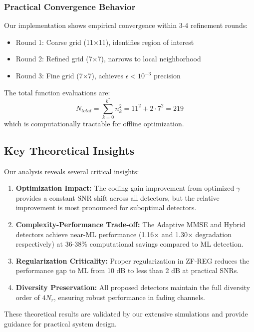 \subsubsection{Practical Convergence Behavior}
Our implementation shows empirical convergence within 3-4 refinement rounds:
\begin{itemize}
    \item Round 1: Coarse grid (11×11), identifies region of interest
    \item Round 2: Refined grid (7×7), narrows to local neighborhood  
    \item Round 3: Fine grid (7×7), achieves $\epsilon < 10^{-3}$ precision
\end{itemize}

The total function evaluations are:
\begin{equation}
N_{total} = \sum_{k=0}^{k^*} n_k^2 = 11^2 + 2 \cdot 7^2 = 219
\end{equation}
which is computationally tractable for offline optimization.

\subsection{Key Theoretical Insights}

Our analysis reveals several critical insights:
\begin{enumerate}
    \item \textbf{Optimization Impact:} The coding gain improvement from optimized $\gamma$ provides a constant SNR shift across all detectors, but the relative improvement is most pronounced for suboptimal detectors.
    
    \item \textbf{Complexity-Performance Trade-off:} The Adaptive MMSE and Hybrid detectors achieve near-ML performance (1.16× and 1.30× degradation respectively) at 36-38\% computational savings compared to ML detection.
    
    \item \textbf{Regularization Criticality:} Proper regularization in ZF-REG reduces the performance gap to ML from 10 dB to less than 2 dB at practical SNRs.
    
    \item \textbf{Diversity Preservation:} All proposed detectors maintain the full diversity order of $4N_r$, ensuring robust performance in fading channels.
\end{enumerate}

These theoretical results are validated by our extensive simulations and provide guidance for practical system design.
